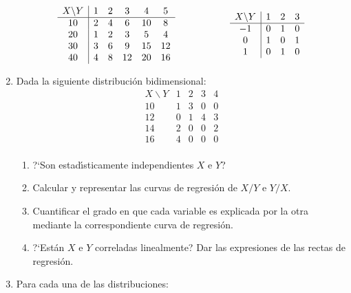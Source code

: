 \documentclass[11pt]{book}
\begin{document}
\begin{enumerate}
$$
    \begin{array}{c|ccccc}
       X \backslash Y &   1  &  2  &  3  &  4  &  5 \\ \hline
        10  &   2  &  4  &  6  &  10 &  8  \\
        20  &   1  &  2  &  3  &  5  &  4  \\
        30  &   3  &  6  &  9  &  15 &  12  \\
        40  &   4  &  8  &  12 &  20 &  16  \\
    \end{array}  \hskip 2cm
  \begin{array}{c|ccc}
         X \backslash Y &   1  &  2  &  3 \\ \hline
           -1  &   0  &  1  &  0  \\
            0  &   1  &  0  &  1  \\
            1  &   0  &  1  &  0  \\
    \end{array}
$$
\item Dada la siguiente distribuci{\'o}n bidimensional:
$$
    \begin{array}{c|cccc}
        X \backslash Y &   1  &  2  &  3  &  4 \\ \hline
          10  &   1  &  3  &  0  &  0  \\
          12  &   0  &  1  &  4  &  3  \\
          14  &   2  &  0  &  0  &  2   \\
          16  &   4  &  0  &  0  &  0   \\
    \end{array}
$$
  \begin{enumerate}
     \item ?`Son estad{\'\i}sticamente independientes $X$ e $Y$?
     \item Calcular y representar las curvas de regresi{\'o}n de $X/Y$ e $Y/X$.
     \item Cuantificar el grado en que cada variable es explicada por la otra mediante la correspon\-dien\-te  curva de regresi\'on.
     \item ?`Est{\'a}n $X$ e $Y$ correladas linealmente? Dar las expresiones de las
           rectas de regresi{\'o}n.
  \end{enumerate}




\item Para cada una de las distribuciones:


\end{enumerate}
\end{document}
